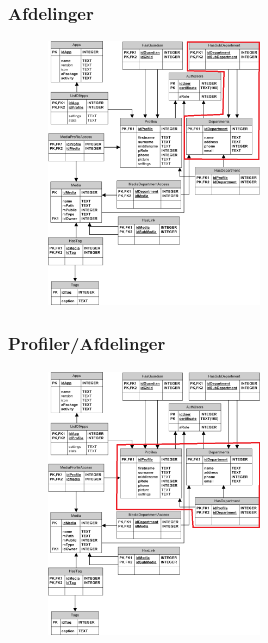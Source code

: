 \documentclass{beamer}
\begin{document}
\begin{frame}
	\frametitle{Afdelinger}
	
	\begin{figure}[!h]
		\centering
			\includegraphics[width=0.5\textwidth]{dbAfdelinger}
		\label{fig:Afdelinger}
	\end{figure}
\end{frame}

\begin{frame}
	\frametitle{Profiler/Afdelinger}
	
	\begin{figure}[!h]
		\centering
			\includegraphics[width=0.5\textwidth]{dbProfil-Afdeling}
		\label{fig:ProfilerAfdelinger}
	\end{figure}
\end{frame}
\end{document}
